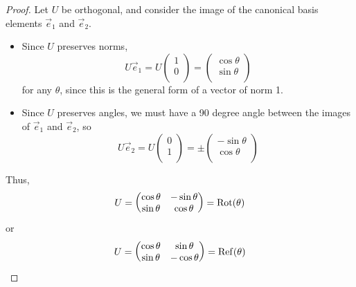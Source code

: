 \documentclass{../template/note}
\begin{document}
    \begin{proof}
        Let \(U\) be orthogonal, and consider the image of the canonical basis elements \(\vec e_1\) and \(\vec e_2\).
        \begin{itemize}
            \item Since \(U\) preserves norms,
            \[
                U \vec e_1 = 
                U \begin{pmatrix}
                 1 \\
                 0 \\
                \end{pmatrix} = \begin{pmatrix}
                 \cos \theta \\
                 \sin \theta \\
                \end{pmatrix}
            \]
            for any \(\theta\), since this is the general form of a vector of norm 1.
            \item Since \(U\) preserves angles, we must have a 90 degree angle between the images of \(\vec e_1\) and \(\vec e_2\), so
            \[
                U \vec e_2 =
                U \begin{pmatrix}
                 0 \\
                 1 \\
                \end{pmatrix} = \pm \begin{pmatrix}
                 -\sin \theta \\
                 \cos \theta \\
                \end{pmatrix}
            \]
        \end{itemize}
        Thus,
        \begin{align*}
            U = \begin{pmatrix}
                \cos \theta & -\sin \theta \\
                \sin \theta & \cos \theta \\
            \end{pmatrix}
            = \operatorname{Rot}(\theta)
        \end{align*}
        or
        \begin{align*}
            U = \begin{pmatrix}
                \cos \theta & \sin \theta \\
                \sin \theta & -\cos \theta \\
            \end{pmatrix}
            = \operatorname{Ref}(\theta)
        \end{align*}
    \end{proof}
    
\end{document}

